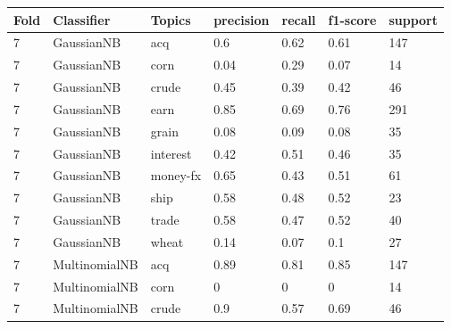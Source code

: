 \documentclass{article}
\begin{document}
\begin{table}[h]
\begin{tabular}{lllllll}
\textbf{Fold} & \textbf{Classifier}    & \textbf{Topics} & \textbf{precision} & \textbf{recall} & \textbf{f1-score} & \textbf{support} \\ \hline
7             & GaussianNB             & acq             & 0.6                & 0.62            & 0.61              & 147              \\
7             & GaussianNB             & corn            & 0.04               & 0.29            & 0.07              & 14               \\
7             & GaussianNB             & crude           & 0.45               & 0.39            & 0.42              & 46               \\
7             & GaussianNB             & earn            & 0.85               & 0.69            & 0.76              & 291              \\
7             & GaussianNB             & grain           & 0.08               & 0.09            & 0.08              & 35               \\
7             & GaussianNB             & interest        & 0.42               & 0.51            & 0.46              & 35               \\
7             & GaussianNB             & money-fx        & 0.65               & 0.43            & 0.51              & 61               \\
7             & GaussianNB             & ship            & 0.58               & 0.48            & 0.52              & 23               \\
7             & GaussianNB             & trade           & 0.58               & 0.47            & 0.52              & 40               \\
7             & GaussianNB             & wheat           & 0.14               & 0.07            & 0.1               & 27               \\
7             & MultinomialNB          & acq             & 0.89               & 0.81            & 0.85              & 147              \\
7             & MultinomialNB          & corn            & 0                  & 0               & 0                 & 14               \\
7             & MultinomialNB          & crude           & 0.9                & 0.57            & 0.69              & 46               \\

\end{tabular}
\end{table}
\end{document}
